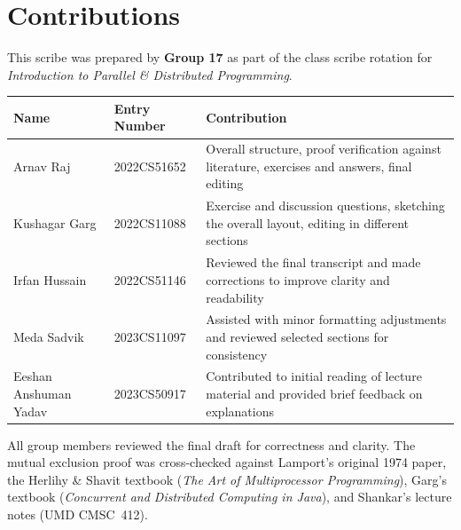 \section*{Contributions}

This scribe was prepared by \textbf{Group 17} as part of the class scribe
rotation for \textit{Introduction to Parallel \& Distributed Programming}.

\bigskip
\renewcommand{\arraystretch}{1.4}
\begin{tabularx}{\textwidth}{|p{}|p{}|X|}
\hline
\textbf{Name} & \textbf{Entry Number} & \textbf{Contribution} \\
\hline
Arnav Raj & 2022CS51652 & Overall structure, proof verification against
literature, exercises and answers, final editing \\
\hline
Kushagar Garg & 2022CS11088 & Exercise and discussion questions, sketching the
overall layout, editing in different sections \\
\hline
Irfan Hussain & 2022CS51146 & Reviewed the final transcript and made
corrections to improve clarity and readability \\
\hline
Meda Sadvik & 2023CS11097 & Assisted with minor formatting adjustments and
reviewed selected sections for consistency \\
\hline
Eeshan Anshuman Yadav & 2023CS50917 & Contributed to initial reading of lecture
material and provided brief feedback on explanations \\
\hline
\end{tabularx}

\bigskip
\noindent All group members reviewed the final draft for correctness and
clarity. The mutual exclusion proof was cross-checked against Lamport's
original 1974 paper, the Herlihy \& Shavit textbook (\textit{The Art of
Multiprocessor Programming}), Garg's textbook (\textit{Concurrent and
Distributed Computing in Java}), and Shankar's lecture notes (UMD CMSC~412).